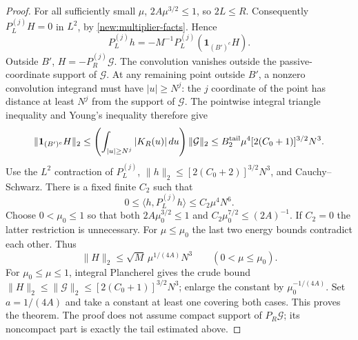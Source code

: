\documentclass[11pt]{article}
\theoremstyle{definition}
\newcommand{\one}{\mathbf 1}
\begin{document}
\begin{proof}
For all sufficiently small $\mu$, $2A\mu^{3/2}\leq1$, so $2L\leq R$.
Consequently $P_L^{(j)}H=0$ in $L^2$, by \cref{new:multiplier-facts}. Hence
\[
 P_L^{(j)}h=-M^{-1}P_L^{(j)}(\one_{(B')^c}H).
\]
Outside $B'$, $H=-P_R^{(j)}\mathcal G$. The convolution vanishes outside the passive-coordinate
support of $\mathcal G$. At any remaining point outside $B'$, a nonzero convolution
integrand must have $|u|\geq N^j$: the $j$ coordinate of the point has distance at least
$N^j$ from the support of $\mathcal G$. The pointwise integral triangle inequality and Young's
inequality therefore give
\[
 \|\one_{(B')^c}H\|_2
 \leq\left(\int_{|u|\geq N^j}|K_R(u)|\,du\right)\|\mathcal G\|_2
 \leq B_2^{\rm tail}\mu^4[2(C_0+1)]^{3/2}N^3.
\]
Use the $L^2$ contraction of $P_L^{(j)}$, $\|h\|_2\leq[2(C_0+2)]^{3/2}N^3$, and
Cauchy--Schwarz. There is a fixed finite $C_2$ such that
\[
 0\leq\langle h,P_L^{(j)}h\rangle\leq C_2\mu^4N^6.
\]
Choose $0<\mu_0\leq1$ so that both $2A\mu_0^{3/2}\leq1$ and
$C_2\mu_0^{7/2}\leq(2A)^{-1}$. If $C_2=0$ the latter restriction is unnecessary.
For $\mu\leq\mu_0$ the last two energy bounds contradict each other. Thus
\[
 \|H\|_2\leq\sqrt M\,\mu^{1/(4A)}N^3\qquad(0<\mu\leq\mu_0).
\]
For $\mu_0\leq\mu\leq1$, integral Plancherel gives the crude bound
$\|H\|_2\leq\|\mathcal G\|_2\leq[2(C_0+1)]^{3/2}N^3$; enlarge the constant by
$\mu_0^{-1/(4A)}$. Set $a=1/(4A)$ and take a constant at least one covering both cases.
This proves the theorem. The proof does not assume compact support of $P_R\mathcal G$;
its noncompact part is exactly the tail estimated above.
\end{proof}
\end{document}
